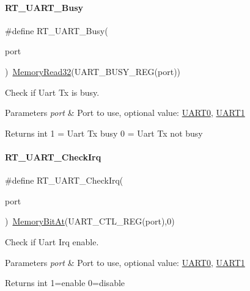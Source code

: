 \paragraph{\texorpdfstring{R\+T\+\_\+\+U\+A\+R\+T\+\_\+\+Busy}{RT\_UART\_Busy}}
{\footnotesize\ttfamily \#define R\+T\+\_\+\+U\+A\+R\+T\+\_\+\+Busy(\begin{DoxyParamCaption}\item[{}]{port }\end{DoxyParamCaption})~\mbox{\hyperlink{a00020_a2d484dc15bdf30ee11ab3b05f31f0e16}{Memory\+Read32}}(U\+A\+R\+T\+\_\+\+B\+U\+S\+Y\+\_\+\+R\+EG(port))}



Check if Uart Tx is busy. 


\begin{DoxyParams}{Parameters}
{\em port} & Port to use, optional value\+: \mbox{\hyperlink{a00056_a0508661f121639ffdee7de2353a0def2}{U\+A\+R\+T0}}, \mbox{\hyperlink{a00056_a8d69bf04d07af4fbbab5a8bd291f65ff}{U\+A\+R\+T1}} \\
\hline
\end{DoxyParams}
\begin{DoxyReturn}{Returns}
int 1 = Uart Tx busy 0 = Uart Tx not busy 
\end{DoxyReturn}
\mbox{\label{a00056_a3e29e879f76b82a13419f4d59a1c3053}} 
\paragraph{\texorpdfstring{R\+T\+\_\+\+U\+A\+R\+T\+\_\+\+Check\+Irq}{RT\_UART\_CheckIrq}}
{\footnotesize\ttfamily \#define R\+T\+\_\+\+U\+A\+R\+T\+\_\+\+Check\+Irq(\begin{DoxyParamCaption}\item[{}]{port }\end{DoxyParamCaption})~\mbox{\hyperlink{a00020_afc530c7e6b49b0ca97c1ad9dac1c4750}{Memory\+Bit\+At}}(U\+A\+R\+T\+\_\+\+C\+T\+L\+\_\+\+R\+EG(port),0)}



Check if Uart Irq enable. 


\begin{DoxyParams}{Parameters}
{\em port} & Port to use, optional value\+: \mbox{\hyperlink{a00056_a0508661f121639ffdee7de2353a0def2}{U\+A\+R\+T0}}, \mbox{\hyperlink{a00056_a8d69bf04d07af4fbbab5a8bd291f65ff}{U\+A\+R\+T1}} \\
\hline
\end{DoxyParams}
\begin{DoxyReturn}{Returns}
int 1=enable 0=disable 
\end{DoxyReturn}
\mbox{\label{a00056_a84e87fc64f3149f1d5171ddca5719220}} 
